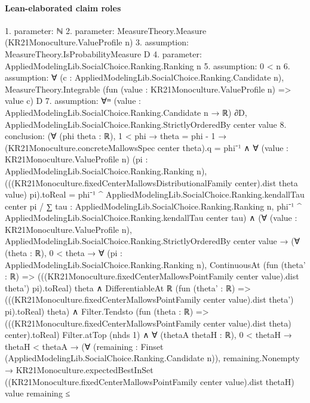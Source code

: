 \documentclass[10pt]{article}
\begin{document}
\paragraph{Lean-elaborated claim roles}\begin{ReviewVerbatim}
1. parameter: ℕ
2. parameter: MeasureTheory.Measure (KR21Monoculture.ValueProfile n)
3. assumption: MeasureTheory.IsProbabilityMeasure D
4. parameter: AppliedModelingLib.SocialChoice.Ranking.Ranking n
5. assumption: 0 < n
6. assumption: ∀ (c : AppliedModelingLib.SocialChoice.Ranking.Candidate n),
  MeasureTheory.Integrable (fun (value : KR21Monoculture.ValueProfile n) => value c) D
7. assumption: ∀ᵐ (value : AppliedModelingLib.SocialChoice.Ranking.Candidate n → ℝ) ∂D,
  AppliedModelingLib.SocialChoice.Ranking.StrictlyOrderedBy center value
8. conclusion: (∀ (phi theta : ℝ),
    1 < phi →
      theta = phi - 1 →
        (KR21Monoculture.concreteMallowsSpec center theta).q = phi⁻¹ ∧
          ∀ (value : KR21Monoculture.ValueProfile n) (pi : AppliedModelingLib.SocialChoice.Ranking.Ranking n),
            (((KR21Monoculture.fixedCenterMallowsDistributionalFamily center).dist theta value) pi).toReal =
              phi⁻¹ ^ AppliedModelingLib.SocialChoice.Ranking.kendallTau center pi /
                ∑ tau : AppliedModelingLib.SocialChoice.Ranking.Ranking n,
                  phi⁻¹ ^ AppliedModelingLib.SocialChoice.Ranking.kendallTau center tau) ∧
  (∀ (value : KR21Monoculture.ValueProfile n),
      AppliedModelingLib.SocialChoice.Ranking.StrictlyOrderedBy center value →
        (∀ (theta : ℝ),
            0 < theta →
              ∀ (pi : AppliedModelingLib.SocialChoice.Ranking.Ranking n),
                ContinuousAt
                    (fun (theta' : ℝ) =>
                      (((KR21Monoculture.fixedCenterMallowsPointFamily center value).dist theta') pi).toReal)
                    theta ∧
                  DifferentiableAt ℝ
                    (fun (theta' : ℝ) =>
                      (((KR21Monoculture.fixedCenterMallowsPointFamily center value).dist theta') pi).toReal)
                    theta) ∧
          Filter.Tendsto
              (fun (theta : ℝ) =>
                (((KR21Monoculture.fixedCenterMallowsPointFamily center value).dist theta) center).toReal)
              Filter.atTop (nhds 1) ∧
            ∀ (thetaA thetaH : ℝ),
              0 < thetaH →
                thetaH < thetaA →
                  (∀ (remaining : Finset (AppliedModelingLib.SocialChoice.Ranking.Candidate n)),
                      remaining.Nonempty →
                        KR21Monoculture.expectedBestInSet
                            ((KR21Monoculture.fixedCenterMallowsPointFamily center value).dist thetaH) value remaining ≤

\end{ReviewVerbatim}
\end{document}
